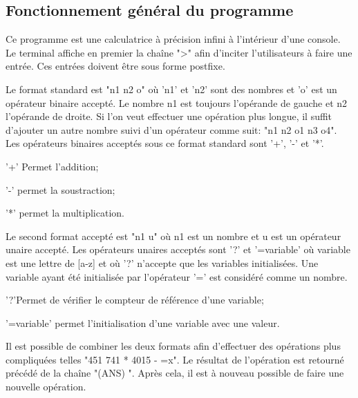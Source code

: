 \documentclass[]{report}
\begin{document}
\begin{normalsize}
		\section*{\LARGE Fonctionnement général du programme}\vspace{4mm}
		Ce programme est une calculatrice à précision infini à l'intérieur d'une console. Le terminal affiche en premier la chaîne "\textgreater " afin d'inciter l'utilisateurs à faire une entrée. Ces entrées doivent être sous forme postfixe.
		\vspace{4mm}
		\par Le format standard est "n1 n2 o" où 'n1' et 'n2' sont des nombres et 'o' est un opérateur binaire accepté. Le nombre n1 est toujours l'opérande de gauche et n2 l'opérande de droite. Si l'on veut effectuer une opération plus longue, il suffit d'ajouter un autre nombre suivi d'un opérateur comme suit: "n1 n2 o1 n3 o4".
		Les opérateurs binaires acceptés sous ce format standard sont '+', '-' et '*'.
		\begin{description}[noitemsep]
			\item \hspace{4mm}'+' Permet l'addition;
			\item \hspace{4mm}'-' permet la soustraction;
			\item \hspace{4mm}'*' permet la multiplication.
		\end{description}
		\par Le second format accepté est "n1 u" où n1 est un nombre et u est un opérateur unaire accepté. Les opérateurs unaires acceptés sont '?' et '=variable' où variable est une lettre de [a-z] et où '?' n'accepte que les variables initialisées. Une variable ayant été initialisée par l'opérateur '=' est considéré comme un nombre.
		\begin{description}[noitemsep]
			\item \hspace{4mm}'?'Permet de vérifier le compteur de référence d'une variable;
			\item \hspace{4mm}'=variable' permet l'initialisation d'une variable avec une valeur.
		\end{description}
		\par Il est possible de combiner les deux formats afin d'effectuer des opérations plus compliquées telles "451 741 * 4015 - =x". Le résultat de l'opération est retourné précédé de la chaîne "(ANS) ". Après cela, il est à nouveau possible de faire une nouvelle opération.

\end{normalsize}
\end{document}
